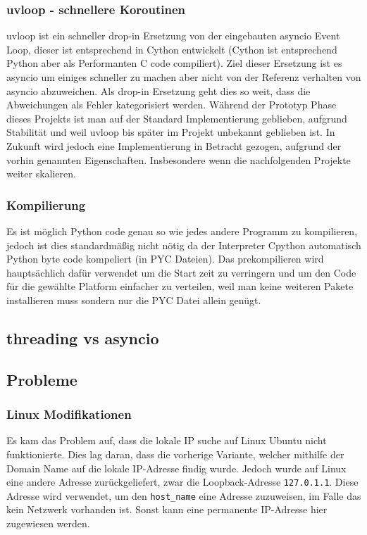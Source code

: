 \subsubsection{uvloop - schnellere Koroutinen}
uvloop ist ein schneller drop-in Ersetzung von der eingebauten asyncio Event Loop, 
dieser ist entsprechend in Cython entwickelt 
(Cython ist entsprechend Python aber als Performanten C code compiliert).
Ziel dieser Ersetzung ist es asyncio um einiges schneller zu machen 
aber nicht von der Referenz verhalten von asyncio abzuweichen. 
Als drop-in Ersetzung geht dies so weit, 
dass die Abweichungen als Fehler kategorisiert werden.
% 
Während der Prototyp Phase dieses Projekts 
ist man auf der Standard Implementierung geblieben, aufgrund Stabilität
und weil uvloop bis später im Projekt unbekannt geblieben ist.
In Zukunft wird jedoch eine Implementierung in Betracht gezogen,
aufgrund der vorhin genannten Eigenschaften.
% 
Insbesondere wenn die nachfolgenden Projekte weiter skalieren.

\subsubsection{Kompilierung}
Es ist möglich Python code genau so wie jedes andere Programm zu kompilieren,
jedoch ist dies standardmäßig nicht nötig 
da der Interpreter Cpython automatisch Python byte code kompeliert (in PYC Dateien).
Das prekompilieren wird hauptsächlich dafür verwendet um die Start zeit zu verringern 
und um den Code für die gewählte Platform einfacher zu verteilen,
weil man keine weiteren Pakete installieren muss sondern
nur die PYC Datei allein genügt.

\subsection{threading vs asyncio}

\subsection{Probleme}
\subsubsection{Linux Modifikationen}
Es kam das Problem auf, dass die lokale IP suche auf Linux Ubuntu nicht funktionierte.
Dies lag daran, dass die vorherige Variante, 
welcher mithilfe der Domain Name auf die lokale IP-Adresse findig wurde.
Jedoch wurde auf Linux eine andere Adresse zurückgeliefert, 
zwar die Loopback-Adresse \texttt{127.0.1.1}. 
Diese Adresse wird verwendet, um den \texttt{host\_name} eine Adresse zuzuweisen,
im Falle das kein Netzwerk vorhanden ist. 
Sonst kann eine permanente IP-Adresse hier zugewiesen werden.

